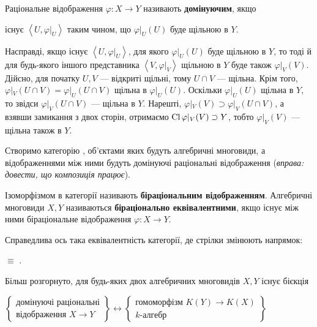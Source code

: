 \documentclass{math_library}
\begin{document}
\begin{definition}
Раціональне відображення $\varphi \colon X \to Y$ називають \textbf{домінуючим}, якщо
\begin{center}
існує $\left<U,\varphi|_U\right>$ таким чином, що $\varphi|_U(U)$ буде щільною в $Y$.
\end{center}
\end{definition}

\begin{remark}
Насправді, якщо існує $\left<U,\varphi|_U\right>$, для якого $\varphi|_U(U)$ буде щільною в $Y$, то тоді й для будь-якого іншого представника $\left<V, \varphi|_V \right>$ щільною в $Y$ буде також $\varphi|_V(V)$.
\bigskip \\
Дійсно, для початку $U,V$ --- відкриті щільні, тому $U \cap V$ --- щільна. Крім того, $\varphi|_V (U \cap V) = \varphi|_U (U \cap V)$ щільна в $\varphi|_U(U)$. Оскільки $\varphi|_U(U)$ щільна в $Y$, то звідси $\varphi|_V(U \cap V)$ --- щільна в $Y$. Нарешті, $\varphi|_V(V) \supset \varphi|_V(U \cap V)$, а взявши замикання з двох сторін, отримаємо $\operatorname{Cl} \varphi|_V(V) \supset Y$, тобто $\varphi|_V(V)$ --- щільна також в $Y$.
\end{remark}

Створимо категорію \vardom, об'єктами яких будуть алгебричні многовиди, а відображеннями між ними будуть домінуючі раціональні відображення (\textit{вправа: довести, що композиція працює}).

\begin{definition}
Ізоморфізмом в категорії \vardom називають \textbf{біраціональним відображенням}. Алгебричні многовиди $X,Y$ називаються \textbf{біраціонально еквівалентними}, якщо існує між ними біраціональне відображення $\varphi \colon X \to Y$. 
\end{definition}

\begin{theorem}
Справедлива ось така еквівалентність категорії, де стрілки змінюють напрямок:
\begin{center}
\vardom $\equiv$ \fgFieldExt .
\end{center}
Більш розгорнуто, для будь-яких двох алгебричних многовидів $X,Y$ існує бієкція
\begin{center}
$\left\{ \substack{\text{домінуючі раціональні} \\ \text{відображення $X \to Y$}} \right\} \leftrightarrow \left\{  \substack{\text{гомоморфізм $K(Y) \to K(X)$} \\ \text{$k$-алгебр}} \right\}$
\end{center}
\end{theorem}
\end{document}
